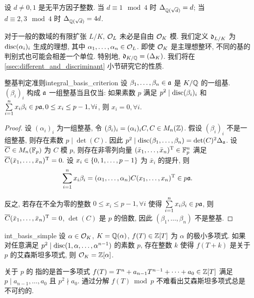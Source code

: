 \begin{exercise}
设 $d\neq 0,1$ 是无平方因子整数. 当 $d\equiv 1\mod 4$ 时 $\Delta_{{\mathbb{Q}}(\sqrt{d})}=d$; 当 $d\equiv 2,3\mod 4$ 时 $\Delta_{{\mathbb{Q}}(\sqrt{d})}=4d$.
\end{exercise}

\begin{remark}
对于一般的数域的有限扩张 $L/K$, ${\mathcal{O}}_L$ 未必是自由 ${\mathcal{O}}_K$ 模. 我们定义 ${\mathfrak{d}}_{L/K}$ 为 ${\mathrm{disc}}(\alpha_i)_i$ 生成的理想, 其中 $\alpha_1,\dots,\alpha_n\in {\mathcal{O}}_L$. 即使 ${\mathcal{O}}_K$ 是主理想整环, 不同的基的判别式也可能会相差一个单位. 特别地, ${\mathfrak{d}}_{K/{\mathbb{Q}}}=(\Delta_K)$. 我们将在 \ref{ssec:different_and_discriminant} 小节研究它的性质.
\end{remark}


\begin{lemma}{整基判定准则}{integral_basis_criterion}
设 $\beta_1,\dots,\beta_n\in {\mathfrak{a}}$ 是 $K/{\mathbb{Q}}$ 的一组基. $(\beta_i)_i$ 构成 ${\mathfrak{a}}$ 一组整基当且仅当: 如果素数 $p$ 满足 $p^2\mid{\mathrm{disc}}(\beta_i)_i$ 和 $\sum\limits_{i=1}^n x_i\beta_i\in p{\mathfrak{a}}, 0\le x_i\le p-1, \forall i$, 则 $x_i=0,\forall i$.
\end{lemma}
\begin{proof}
设 $(\alpha_i)_i$ 为一组整基, 令 $(\beta_i)_i=(\alpha_i)_iC,C\in M_n({\mathbb{Z}})$. 假设 $(\beta_i)_i$ 不是一组整基, 则存在素数 $p\mid \det(C)$. 因此 $p^2\mid {\mathrm{disc}}(\beta_1,\dots,\beta_n)=\det(C)^2 \Delta_{\mathfrak{a}}$. 设 $\overline C\in M_n({\mathbb{F}}_p)$ 为 $C$ 模 $p$, 则存在非零列向量 $(\bar x_1,\dots,\bar x_n)^{\mathrm{T}}\in{\mathbb{F}}_p^n$ 满足 $\overline C(\bar x_1,\dots,\bar x_n)^{\mathrm{T}}=0.$ 设 $x_i\in\left\{0,1,\dots,p-1\right\}$ 为 $\bar x_i$ 的提升, 则 
	\[\sum_{i=1}^n x_i\beta_i=(\alpha_1,\dots,\alpha_n) C(x_1,\dots,x_n)^{\mathrm{T}}\in p{\mathfrak{a}}.\]

反之, 若存在不全为零的整数 $0\le x_i\le p-1, \forall i$ 使得 $\sum\limits_{i=1}^n x_i\beta_i\in p{\mathfrak{a}}$, 则 $\overline C (\bar x_1,\dots,\bar x_n)^{\mathrm{T}}=0$, $\det(C)$ 是 $p$ 的倍数, 因此 $(\beta_1,\dots,\beta_n)$ 不是整基. 
\end{proof}

\begin{proposition}{}{int_basis_simple}
设 $\alpha\in{\mathcal{O}}_K$, $K={\mathbb{Q}}(\alpha)$, $f(T)\in{\mathbb{Z}}[T]$ 为 $\alpha$ 的极小多项式. 如果对任意满足 $p^2\mid{\mathrm{disc}}(1,\alpha,\dots,\alpha^{n-1})$ 的素数 $p$, 存在整数 $k$ 使得 $f(T+k)$ 是关于 $p$ 的艾森斯坦多项式, 则 ${\mathcal{O}}_K={\mathbb{Z}}[\alpha]$.
\end{proposition}

关于 $p$ 的 指的是首一多项式 $f(T)=T^n+a_{n-1}T^{n-1}+\dots+a_0 \in{\mathbb{Z}}[T]$ 满足 $p\mid a_{n-1},\dots,a_0$ 且 $p^2\nmid a_0$. 通过分解 $f(T)\bmod p$ 不难看出艾森斯坦多项式总是不可约的.

